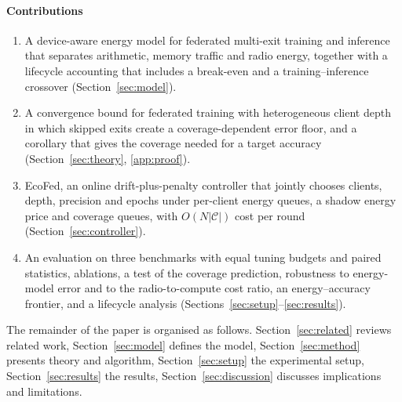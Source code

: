\paragraph{Contributions}
\begin{enumerate}[leftmargin=1.6em,itemsep=1pt]
\item A device-aware energy model for federated multi-exit training and inference that separates arithmetic, memory traffic and radio energy, together with a lifecycle accounting that includes a break-even and a training--inference crossover (Section~\ref{sec:model}).
\item A convergence bound for federated training with heterogeneous client depth in which skipped exits create a coverage-dependent error floor, and a corollary that gives the coverage needed for a target accuracy (Section~\ref{sec:theory}, \ref{app:proof}).
\item EcoFed, an online drift-plus-penalty controller that jointly chooses clients, depth, precision and epochs under per-client energy queues, a shadow energy price and coverage queues, with $O(N|\mathcal C|)$ cost per round (Section~\ref{sec:controller}).
\item An evaluation on three benchmarks with equal tuning budgets and paired statistics, ablations, a test of the coverage prediction, robustness to energy-model error and to the radio-to-compute cost ratio, an energy--accuracy frontier, and a lifecycle analysis (Sections~\ref{sec:setup}--\ref{sec:results}).
\end{enumerate}
The remainder of the paper is organised as follows. Section~\ref{sec:related} reviews related work, Section~\ref{sec:model} defines the model, Section~\ref{sec:method} presents theory and algorithm, Section~\ref{sec:setup} the experimental setup, Section~\ref{sec:results} the results, Section~\ref{sec:discussion} discusses implications and limitations.
